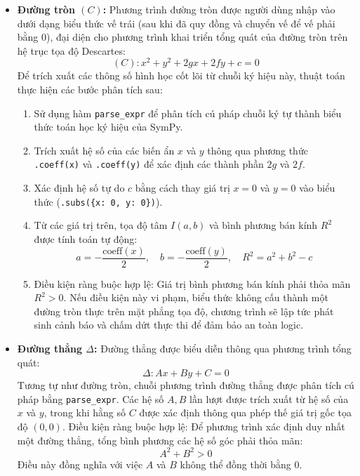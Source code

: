 \documentclass[12pt,a4paper]{article}
\begin{document}
\begin{itemize}[leftmargin=*]
    \item \textbf{Đường tròn $(C)$:}
    Phương trình đường tròn được người dùng nhập vào dưới dạng biểu thức vế trái (sau khi đã quy đồng và chuyển vế để vế phải bằng $0$), đại diện cho phương trình khai triển tổng quát của đường tròn trên hệ trục tọa độ Descartes:
    $$(C): x^2 + y^2 + 2gx + 2fy + c = 0$$
    Để trích xuất các thông số hình học cốt lõi từ chuỗi ký hiệu này, thuật toán thực hiện các bước phân tích sau:
    \begin{enumerate}
        \item Sử dụng hàm \texttt{parse\_expr} để phân tích cú pháp chuỗi ký tự thành biểu thức toán học ký hiệu của SymPy.
        \item Trích xuất hệ số của các biến ẩn $x$ và $y$ thông qua phương thức \texttt{.coeff(x)} và \texttt{.coeff(y)} để xác định các thành phần $2g$ và $2f$.
        \item Xác định hệ số tự do $c$ bằng cách thay giá trị $x = 0$ và $y = 0$ vào biểu thức (\texttt{.subs(\{x: 0, y: 0\})}).
        \item Từ các giá trị trên, tọa độ tâm $I(a, b)$ và bình phương bán kính $R^2$ được tính toán tự động:
        $$a = -\frac{\text{coeff}(x)}{2}, \quad b = -\frac{\text{coeff}(y)}{2}, \quad R^2 = a^2 + b^2 - c$$
        \item Điều kiện ràng buộc hợp lệ: Giá trị bình phương bán kính phải thỏa mãn $R^2 > 0$. Nếu điều kiện này vi phạm, biểu thức không cấu thành một đường tròn thực trên mặt phẳng tọa độ, chương trình sẽ lập tức phát sinh cảnh báo và chấm dứt thực thi để đảm bảo an toàn logic.
    \end{enumerate}

    \item \textbf{Đường thẳng $\Delta$:}
    Đường thẳng được biểu diễn thông qua phương trình tổng quát:
    $$\Delta: Ax + By + C = 0$$
    Tương tự như đường tròn, chuỗi phương trình đường thẳng được phân tích cú pháp bằng \texttt{parse\_expr}. Các hệ số $A, B$ lần lượt được trích xuất từ hệ số của $x$ và $y$, trong khi hằng số $C$ được xác định thông qua phép thế giá trị gốc tọa độ $(0, 0)$.
    \newline
    Điều kiện ràng buộc hợp lệ: Để phương trình xác định duy nhất một đường thẳng, tổng bình phương các hệ số góc phải thỏa mãn:
    $$A^2 + B^2 > 0$$
    Điều này đồng nghĩa với việc $A$ và $B$ không thể đồng thời bằng $0$.
\end{itemize}
\end{document}
